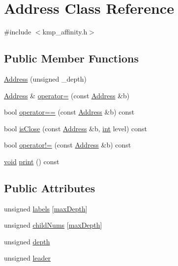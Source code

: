 \hypertarget{classAddress}{\section{Address Class Reference}
\label{classAddress}
}


{\ttfamily \#include $<$kmp\-\_\-affinity.\-h$>$}

\subsection*{Public Member Functions}
\begin{DoxyCompactItemize}
\item 
\hyperlink{classAddress_a50c3a5bb9f60be276f7d425a1b373966}{Address} (unsigned \-\_\-depth)
\item 
\hyperlink{classAddress}{Address} \& \hyperlink{classAddress_a16c1cdab8d3345e4237e6209a21422d1}{operator=} (const \hyperlink{classAddress}{Address} \&b)
\item 
bool \hyperlink{classAddress_a2daeaeef46aa7d76d9239da5175eba29}{operator==} (const \hyperlink{classAddress}{Address} \&b) const 
\item 
bool \hyperlink{classAddress_a67cf8a59b7411a21af96bce3081d32a6}{is\-Close} (const \hyperlink{classAddress}{Address} \&b, \hyperlink{ittnotify__static_8h_a8b8dcd723308a8cb5d84277c7a3fff70}{int} level) const 
\item 
bool \hyperlink{classAddress_a971ef7be92846aca64bfa9d96e5a8006}{operator!=} (const \hyperlink{classAddress}{Address} \&b) const 
\item 
\hyperlink{ittnotify__static_8h_af941d56e55e3c5465135b60c4d6343ed}{void} \hyperlink{classAddress_a0bd089006498e492db87e3a9a9c6737b}{print} () const 
\end{DoxyCompactItemize}
\subsection*{Public Attributes}
\begin{DoxyCompactItemize}
\item 
unsigned \hyperlink{classAddress_a0a5fc0038932317cd8f46d802850996a}{labels} \mbox{[}\hyperlink{classAddress_a3c90109b9f20aa28996a78712557683c}{max\-Depth}\mbox{]}
\item 
unsigned \hyperlink{classAddress_aae88cf413f1d90429d34a23387a8fe81}{child\-Nums} \mbox{[}\hyperlink{classAddress_a3c90109b9f20aa28996a78712557683c}{max\-Depth}\mbox{]}
\item 
unsigned \hyperlink{classAddress_a1adef13df4b328813a1bf4b92c56ee10}{depth}
\item 
unsigned \hyperlink{classAddress_ab1535594352babbc297fc1d2b5a48c1a}{leader}
\end{DoxyCompactItemize}
